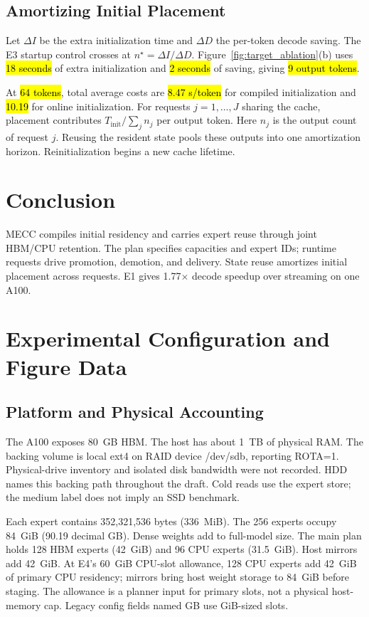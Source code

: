 \documentclass[conference,9pt,letterpaper]{IEEEtran}
\DeclareRobustCommand{\pending}[1]{{\sethlcolor{yellow}\hl{#1}}}
\begin{document}
\subsection{Amortizing Initial Placement}
\label{sec:amortization}
Let $\Delta I$ be the extra initialization time and $\Delta D$ the per-token decode saving. The E3 startup control crosses at $n^\star=\Delta I/\Delta D$. Figure~\ref{fig:target_ablation}(b) uses \pending{18 seconds} of extra initialization and \pending{2 seconds} of saving, giving \pending{9 output tokens}.

At \pending{64 tokens}, total average costs are \pending{8.47 s/token} for compiled initialization and \pending{10.19} for online initialization. For requests $j=1,\ldots,J$ sharing the cache, placement contributes $T_{\mathrm{init}}/\sum_j n_j$ per output token. Here $n_j$ is the output count of request $j$. Reusing the resident state pools these outputs into one amortization horizon. Reinitialization begins a new cache lifetime.

\section{Conclusion}
MECC compiles initial residency and carries expert reuse through joint HBM/CPU retention. The plan specifies capacities and expert IDs; runtime requests drive promotion, demotion, and delivery. State reuse amortizes initial placement across requests. E1 gives 1.77$\times$ decode speedup over streaming on one A100.

\clearpage
\balance


\clearpage
\appendices
\balance
\section{Experimental Configuration and Figure Data}
\label{app:setup}
\subsection{Platform and Physical Accounting}
The A100 exposes 80~GB HBM. The host has about 1~TB of physical RAM. The backing volume is local ext4 on RAID device /dev/sdb, reporting ROTA=1. Physical-drive inventory and isolated disk bandwidth were not recorded. HDD names this backing path throughout the draft. Cold reads use the expert store; the medium label does not imply an SSD benchmark.

Each expert contains 352,321,536 bytes (336~MiB). The 256 experts occupy 84~GiB (90.19 decimal GB). Dense weights add to full-model size. The main plan holds 128 HBM experts (42~GiB) and 96 CPU experts (31.5~GiB). Host mirrors add 42~GiB. At E4's 60~GiB CPU-slot allowance, 128 CPU experts add 42~GiB of primary CPU residency; mirrors bring host weight storage to 84~GiB before staging. The allowance is a planner input for primary slots, not a physical host-memory cap. Legacy config fields named GB use GiB-sized slots.
\end{document}
